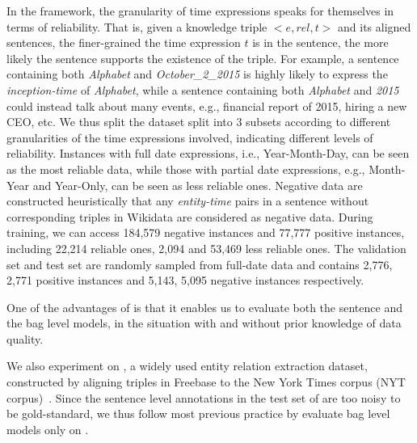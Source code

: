 In the \DS framework, the granularity of time expressions speaks for themselves in
terms of reliability. That is, given a knowledge triple $<$$e,rel,t$$>$ and its
aligned sentences,  the  finer-grained the time expression $t$ is in the sentence,
the more likely the sentence  supports the existence of the triple.
For example, a sentence containing both \emph{Alphabet} and \emph{October\_2\_2015} is highly likely to express the \emph{inception-time} of \emph{Alphabet}, while a sentence containing both \emph{Alphabet} and \emph{2015} could instead talk  about many events, e.g.,  financial report of 2015, hiring a new CEO, etc.
We thus split the dataset split into
3 subsets according to different granularities of the time expressions involved, indicating different levels of reliability.
Instances with full date expressions, i.e., Year-Month-Day, can be seen as the most reliable data, while those with
partial date expressions, e.g., Month-Year and Year-Only, can be seen as less
reliable ones.  Negative data are constructed  heuristically that any
\emph{entity-time} pairs in a sentence without corresponding triples in Wikidata are considered as negative data.  
During training, we can access  184,579 negative
instances and  77,777 positive instances, including 22,214 reliable
ones, 2,094 and 53,469 less reliable ones. The validation set and test set are randomly sampled from full-date data and contains
2,776, 2,771 positive instances and 5,143, 5,095 negative instances respectively.  


One of the advantages of \TimeRE is that it enables us to evaluate both the sentence and the bag level models, in the situation with and without prior knowledge of data quality.

We also experiment on \EntityRE, a widely used entity
relation extraction dataset, constructed by aligning triples
in Freebase to the New York Times corpus (NYT
corpus)~\cite{riedel2010modeling}.  
Since the sentence level annotations in the test set of \EntityRE are too noisy to be gold-standard,  we thus follow most previous practice by evaluate bag level models only on \EntityRE.


